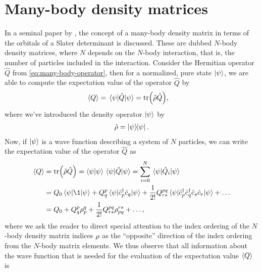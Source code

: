     \section{Many-body density matrices}
        In a seminal paper by \citeauthor{lowdin-density-matrices}
        \cite{lowdin-density-matrices}, the concept of a many-body density
        matrix in terms of the orbitals of a Slater determinant is discussed.
        These are dubbed $N$-body density matrices, where $N$ depends on the
        $N$-body interaction, that is, the number of particles included in the
        interaction.
        Consider the Hermitian operator $\hat{Q}$ from
        \autoref{eq:many-body-operator}, then for a normalized, pure state
        $\ket{\psi}$, we are able to compute the expectation value of the
        operator $\hat{Q}$ by
        \begin{align}
            \expval{Q} &= \mel{\psi}{\hat{Q}}{\psi}
            = \tr(\hat{\rho} \hat{Q}),
        \end{align}
        where we've introduced the density operator $\ket{\psi}$ by
        \begin{align}
            \density = \dyad{\psi}{\psi}.
        \end{align}
        Now, if $\ket{\psi}$ is a wave function describing a system of $N$
        particles, we can write the expectation value of the operator $\hat{Q}$
        as
        \begin{align}
            \expval{Q}
            &= \tr(\density \hat{Q})
            = \braket{\psi}\mel{\psi}{\hat{Q}}{\psi}
            = \sum_{i = 0}^{N} \mel{\psi}{\hat{Q}_i}{\psi}
            \\
            &=
            Q_0 \mel{\psi}{\1}{\psi}
            + Q^{p}_{q}\mel{\psi}{\ccr{p}\can{q}}{\psi}
            + \frac{1}{2!}
            Q^{pq}_{rs}
            \mel{\psi}{\ccr{p}\ccr{q}\can{s}\can{r}}{\psi}
            + \dots
            \\
            &= Q_0 + Q^{p}_{q}\densityten^{q}_{p}
            + \frac{1}{2!} Q^{pq}_{rs} \densityten^{rs}_{pq}
            + \dots,
        \end{align}
        where we ask the reader to direct special attention to the index
        ordering of the $N$-body density matrix indices $\rho$ as the
        ``opposite'' direction of the index ordering from the $N$-body matrix
        elements.
        We thus observe that all information about the wave function that is
        needed for the evaluation of the expectation value $\expval{Q}$ is
